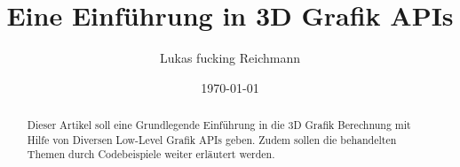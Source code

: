 \documentclass[10pt,conference,a4paper]{IEEEtran}
\title{Eine Einführung in 3D Grafik APIs}
\author{Lukas fucking Reichmann}
\date{\today}
\begin{document}
\maketitle

\begin{abstract}
    Dieser Artikel soll eine Grundlegende Einführung in die 3D Grafik Berechnung mit Hilfe von Diversen Low-Level Grafik APIs geben. Zudem sollen die behandelten Themen durch Codebeispiele weiter erläutert werden.
\end{abstract}









\end{document}
